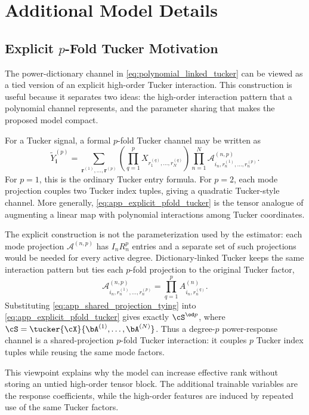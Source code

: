 \section{Additional Model Details}
\label{app:model_details}

\subsection{Explicit \(p\)-Fold Tucker Motivation}
\label{app:pfold_tucker_motivation}

The power-dictionary channel in \eqref{eq:polynomial_linked_tucker} can be
viewed as a tied version of an explicit high-order Tucker interaction. This
construction is useful because it separates two ideas: the high-order
interaction pattern that a polynomial channel represents, and the parameter
sharing that makes the proposed model compact.

For a Tucker signal, a formal \(p\)-fold Tucker channel may be written as
\begin{equation}
  \widetilde{Y}^{(p)}_{\mathbf{i}}
  =
  \sum_{\mathbf{r}^{(1)},\ldots,\mathbf{r}^{(p)}}
  \left(
  \prod_{q=1}^{p}
  X_{r_1^{(q)},\ldots,r_N^{(q)}}
  \right)
  \prod_{n=1}^{N}
  \mathcal{A}^{(n,p)}_{i_n,r_n^{(1)},\ldots,r_n^{(p)}} .
  \label{eq:app_explicit_pfold_tucker}
\end{equation}
For \(p=1\), this is the ordinary Tucker entry formula. For \(p=2\), each
mode projection couples two Tucker index tuples, giving a quadratic
Tucker-style channel. More generally, \eqref{eq:app_explicit_pfold_tucker}
is the tensor analogue of augmenting a linear map with polynomial interactions
among Tucker coordinates.

The explicit construction is not the parameterization used by the estimator:
each mode projection \(\mathcal{A}^{(n,p)}\) has \(I_nR_n^p\) entries and a
separate set of such projections would be needed for every active degree.
Dictionary-linked Tucker keeps the same interaction pattern but ties each
\(p\)-fold projection to the original Tucker factor,
\begin{equation}
  \mathcal{A}^{(n,p)}_{i_n,r_n^{(1)},\ldots,r_n^{(p)}}
  =
  \prod_{q=1}^{p} A^{(n)}_{i_n,r_n^{(q)}} .
  \label{eq:app_shared_projection_tying}
\end{equation}
Substituting \eqref{eq:app_shared_projection_tying} into
\eqref{eq:app_explicit_pfold_tucker} gives exactly
\(\cS^{\od p}\), where
\(\cS=\tucker{\cX}{\bA^{(1)},\ldots,\bA^{(N)}}\). Thus a degree-\(p\)
power-response channel is a shared-projection \(p\)-fold Tucker interaction: it
couples \(p\) Tucker index tuples while reusing the same mode factors.

This viewpoint explains why the model can increase effective rank without
storing an untied high-order tensor block. The
additional trainable variables are the response coefficients, while the
high-order features are induced by repeated use of the same Tucker factors.
